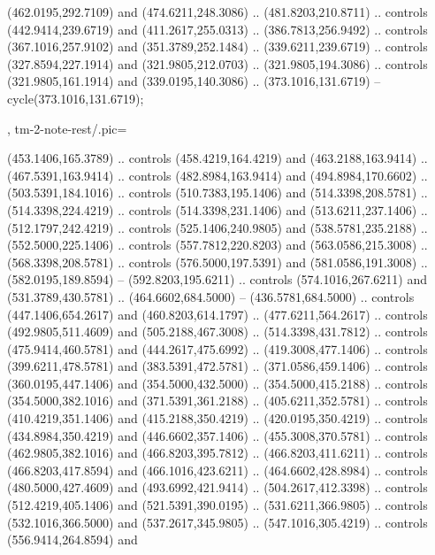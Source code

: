 {{\begin{scope}[y=-0.80pt,x=0.80pt,scale=0.038,xshift=-340pt,yshift=228pt]
        (462.0195,292.7109) and (474.6211,248.3086) .. (481.8203,210.8711) .. controls
        (442.9414,239.6719) and (411.2617,255.0313) .. (386.7813,256.9492) .. controls
        (367.1016,257.9102) and (351.3789,252.1484) .. (339.6211,239.6719) .. controls
        (327.8594,227.1914) and (321.9805,212.0703) .. (321.9805,194.3086) .. controls
        (321.9805,161.1914) and (339.0195,140.3086) .. (373.1016,131.6719) --
        cycle(373.1016,131.6719);  
    \end{scope}
  },
  tm-2-note-rest/.pic={
    \begin{scope}[y=-0.80pt,x=0.80pt,scale=0.038,xshift=-370pt,yshift=255pt]
       (453.1406,165.3789) .. controls
        (458.4219,164.4219) and (463.2188,163.9414) .. (467.5391,163.9414) .. controls
        (482.8984,163.9414) and (494.8984,170.6602) .. (503.5391,184.1016) .. controls
        (510.7383,195.1406) and (514.3398,208.5781) .. (514.3398,224.4219) .. controls
        (514.3398,231.1406) and (513.6211,237.1406) .. (512.1797,242.4219) .. controls
        (525.1406,240.9805) and (538.5781,235.2188) .. (552.5000,225.1406) .. controls
        (557.7812,220.8203) and (563.0586,215.3008) .. (568.3398,208.5781) .. controls
        (576.5000,197.5391) and (581.0586,191.3008) .. (582.0195,189.8594) --
        (592.8203,195.6211) .. controls (574.1016,267.6211) and (531.3789,430.5781) ..
        (464.6602,684.5000) -- (436.5781,684.5000) .. controls (447.1406,654.2617) and
        (460.8203,614.1797) .. (477.6211,564.2617) .. controls (492.9805,511.4609) and
        (505.2188,467.3008) .. (514.3398,431.7812) .. controls (475.9414,460.5781) and
        (444.2617,475.6992) .. (419.3008,477.1406) .. controls (399.6211,478.5781) and
        (383.5391,472.5781) .. (371.0586,459.1406) .. controls (360.0195,447.1406) and
        (354.5000,432.5000) .. (354.5000,415.2188) .. controls (354.5000,382.1016) and
        (371.5391,361.2188) .. (405.6211,352.5781) .. controls (410.4219,351.1406) and
        (415.2188,350.4219) .. (420.0195,350.4219) .. controls (434.8984,350.4219) and
        (446.6602,357.1406) .. (455.3008,370.5781) .. controls (462.9805,382.1016) and
        (466.8203,395.7812) .. (466.8203,411.6211) .. controls (466.8203,417.8594) and
        (466.1016,423.6211) .. (464.6602,428.8984) .. controls (480.5000,427.4609) and
        (493.6992,421.9414) .. (504.2617,412.3398) .. controls (512.4219,405.1406) and
        (521.5391,390.0195) .. (531.6211,366.9805) .. controls (532.1016,366.5000) and
        (537.2617,345.9805) .. (547.1016,305.4219) .. controls (556.9414,264.8594) and

\end{scope}}}
